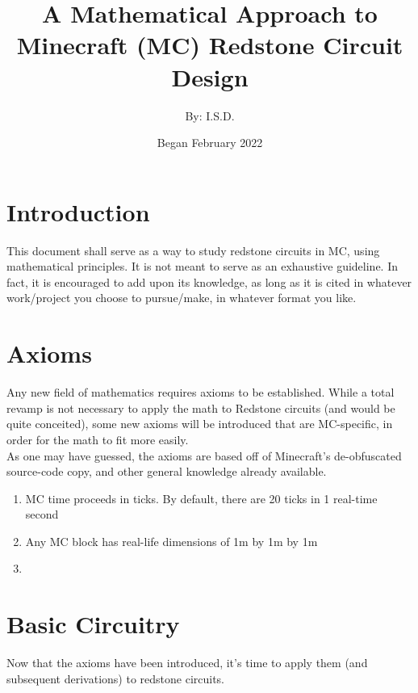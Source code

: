 \documentclass{article}
\title{A Mathematical Approach to Minecraft (MC) Redstone Circuit Design}
\author{By: I.S.D.}
\date{Began February 2022}
\begin{document}
\maketitle

\section{Introduction}

This document shall serve as a way to study redstone circuits in MC, using mathematical principles. It is not meant to serve as an exhaustive guideline. In fact, it is encouraged to add upon its knowledge, as long as it is cited in whatever work/project you choose to pursue/make, in whatever format you like.

\section{Axioms}
Any new field of mathematics requires axioms to be established. While a total revamp is not necessary to apply the math to Redstone circuits (and would be quite conceited), some new axioms will be introduced that are MC-specific, in order for the math to fit more easily. \\

\noindent
As one may have guessed, the axioms are based off of Minecraft's de-obfuscated source-code copy, and other general knowledge already available.

\begin{enumerate}
\item MC time proceeds in ticks. By default, there are 20 ticks in 1 real-time second
\item Any MC block has real-life dimensions of 1m by 1m by 1m
\item 
\end{enumerate}

\section{Basic Circuitry}
Now that the axioms have been introduced, it's time to apply them (and subsequent derivations) to redstone circuits.
\end{document}
